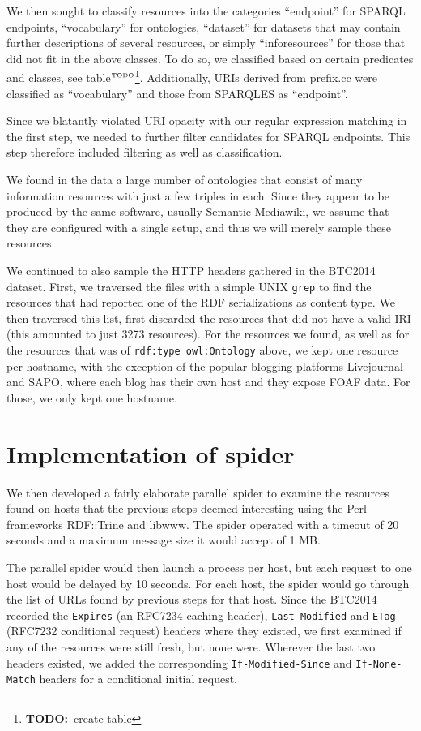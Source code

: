 \documentclass{article}
\newcommand{\rdfterm}[1]{\texttt{#1}}
\newcommand{\httph}[1]{\texttt{#1}}
\newcommand{\todo}[1]{\ensuremath{^{\textrm{\tiny{TODO}\normalsize}}}\footnote{\textbf{TODO:}~#1}}
\begin{document}
\begin{appendices}
We then sought to classify resources into the categories ``endpoint''
for SPARQL endpoints, ``vocabulary'' for ontologies, ``dataset'' for
datasets that may contain further descriptions of several resources,
or simply ``inforesources'' for those that did not fit in the above
classes. To do so, we classified based on certain predicates and
classes, see table\todo{create table}. Additionally, URIs derived from
prefix.cc were classified as ``vocabulary'' and those from SPARQLES as
``endpoint''.

Since we blatantly violated URI opacity with our regular expression
matching in the first step, we needed to further filter candidates for
SPARQL endpoints. This step therefore included filtering as well as
classification.

We found in the data a large number of ontologies that consist of many
information resources with just a few triples in each. Since they
appear to be produced by the same software, usually Semantic
Mediawiki, we assume that they are configured with a single setup, and
thus we will merely sample these resources.

We continued to also sample the HTTP headers gathered in the BTC2014
dataset. 
First, we traversed the files with a simple UNIX \texttt{grep} to find
the resources that had reported one of the RDF serializations as
content type. We then traversed this list, first discarded the
resources that did not have a valid IRI (this amounted to just 3273
resources). For the resources we found, as well as for the resources
that was of \rdfterm{rdf:type owl:Ontology} above, we kept one
resource per hostname, with the exception of the popular blogging
platforms Livejournal and SAPO, where each blog has their own host and
they expose FOAF data. For those, we only kept one hostname. 

\section{Implementation of spider}\label{app:fetcher}

We then developed a fairly elaborate parallel spider to examine the
resources found on hosts that the previous steps deemed interesting
using the Perl frameworks RDF::Trine and libwww. The spider operated
with a timeout of 20 seconds and a maximum message size it would
accept of 1 MB.

The parallel spider would then launch a process per host, but each
request to one host would be delayed by 10 seconds. For each host, the
spider would go through the list of URLs found by previous steps for
that host. Since the BTC2014 recorded
the \httph{Expires} (an RFC7234 caching header), \httph{Last-Modified}
and \httph{ETag} (RFC7232 conditional request) headers where they
existed, we first examined if any of the resources were still fresh,
but none were. Wherever the last two headers existed, we added the
corresponding \httph{If-Modified-Since} and \httph{If-None-Match}
headers for a conditional initial request.


\end{appendices}
\end{document}
